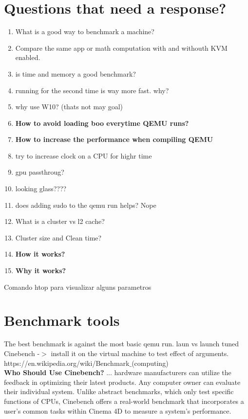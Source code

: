 \documentclass[11pt, a4paper, oneside]{article}
\theoremstyle{definition}
\begin{document}
\section{Questions that need a response?}
\begin{enumerate}
	\item What is a good way to benchmark a machine?
	\item Compare the same app or math computation with and withouth KVM enabled.
	\item is time and memory a good benchmark?
	\item running for the second time is way more fast. why?
	\item why use W10? (thats not may goal)
	\item \textbf{How to avoid loading boo everytime QEMU runs?}
	\item \textbf{How to increase the performance when compiling QEMU}
	\item try to increase clock on a CPU for highr time
	\item gpu passthroug?
	\item looking glass????
	\item does adding sudo to the qemu run helps? Nope
	\item What is a cluster vs l2 cache?
	\item Cluster size and Clean time?
	\item \textbf{How it works?}
	\item \textbf{Why it works?}
\end{enumerate}

Comando htop para visualizar alguns parametros
\vfill
\pagebreak
\section{Benchmark tools}
The best benchmark is against the most basic qemu run. laun vs launch tuned\\

Cinebench -$>$ install it on the virtual machine to test effect of arguments.\\

https://en.wikipedia.org/wiki/Benchmark$\_$(computing)
\\
\textbf{Who Should Use Cinebench? }
... hardware manufacturers can utilize the feedback in optimizing their latest products. Any computer owner can evaluate their individual system. Unlike abstract benchmarks, which only test specific functions of CPUs, Cinebench offers a real-world benchmark that incorporates a user's common tasks within Cinema 4D to measure a system's performance.\\
\end{document}
